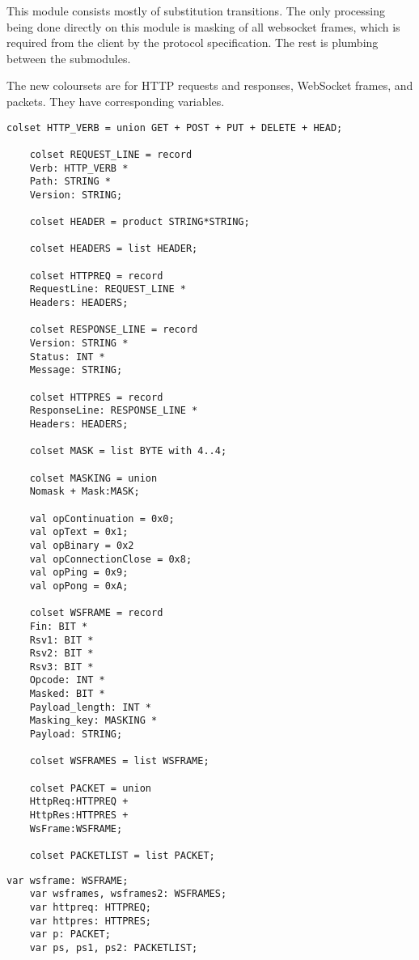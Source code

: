 
	This module consists mostly of substitution transitions. The only processing
	being done directly on this module is masking of all websocket frames, which is required from the
	client by the protocol specification. The rest is plumbing between the
	submodules.
	
	The new coloursets are for HTTP requests and responses, WebSocket frames, and
	packets. They have corresponding variables. 
	
	\begin{lstlisting}[label=lst:client_lib_colset,caption=Library colour
	sets,gobble=1]
	colset HTTP_VERB = union GET + POST + PUT + DELETE + HEAD;
	
	colset REQUEST_LINE = record
	Verb: HTTP_VERB *
	Path: STRING *
	Version: STRING;
	
	colset HEADER = product STRING*STRING;
	
	colset HEADERS = list HEADER;
	
	colset HTTPREQ = record
	RequestLine: REQUEST_LINE *
	Headers: HEADERS;
	
	colset RESPONSE_LINE = record
	Version: STRING *
	Status: INT *
	Message: STRING;
	
	colset HTTPRES = record
	ResponseLine: RESPONSE_LINE *
	Headers: HEADERS;
	
	colset MASK = list BYTE with 4..4;
	
	colset MASKING = union
	Nomask + Mask:MASK;
	
	val opContinuation = 0x0;
	val opText = 0x1;
	val opBinary = 0x2
	val opConnectionClose = 0x8;
	val opPing = 0x9;
	val opPong = 0xA;
	
	colset WSFRAME = record
	Fin: BIT *
	Rsv1: BIT *
	Rsv2: BIT *
	Rsv3: BIT *
	Opcode: INT *
	Masked: BIT *
	Payload_length: INT *
	Masking_key: MASKING *
	Payload: STRING;
	
	colset WSFRAMES = list WSFRAME;
	
	colset PACKET = union 
	HttpReq:HTTPREQ + 
	HttpRes:HTTPRES +
	WsFrame:WSFRAME;

	colset PACKETLIST = list PACKET;
	\end{lstlisting}
	
	\begin{lstlisting}[label=lst:client_lib_vars,caption=Library
	variables,gobble=1]
	var wsframe: WSFRAME;
	var wsframes, wsframes2: WSFRAMES;
	var httpreq: HTTPREQ;
	var httpres: HTTPRES;
	var p: PACKET;
	var ps, ps1, ps2: PACKETLIST;
	\end{lstlisting}
	

